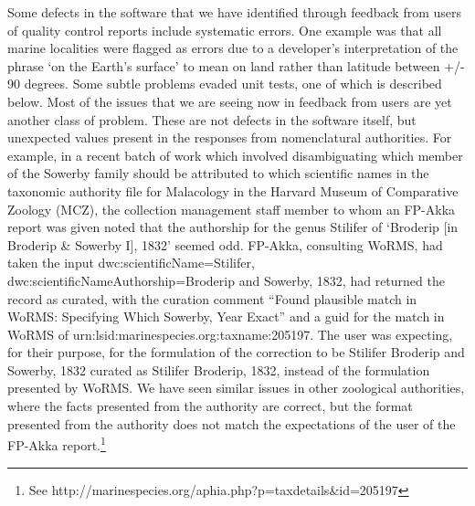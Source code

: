 \documentclass{article}
\begin{document}
Some defects in the software that we have identified through feedback from users of quality control reports include systematic errors. One example was that all marine localities were flagged as errors due to a developer's interpretation of the phrase `on the Earth's surface' to mean on land rather than latitude between +/- 90 degrees.
Some subtle problems evaded unit tests, one of which is described below.
Most of the issues that we are seeing now in feedback from users are yet another class of problem. These are not defects in the software itself, but unexpected values present in the responses from nomenclatural authorities.  For example, in a recent batch of work which involved disambiguating which member of the Sowerby family should be attributed to which scientific names in the taxonomic authority file for Malacology in the Harvard Museum of Comparative Zoology (MCZ), the collection management staff member to whom an FP-Akka report was given noted that the authorship for the genus Stilifer of `Broderip [in Broderip \& Sowerby I], 1832' seemed odd.  FP-Akka, consulting WoRMS, had taken the input dwc:scientificName=Stilifer, dwc:scientificNameAuthorship=Broderip and Sowerby, 1832, had returned the record as curated, with the curation comment ``Found plausible match in WoRMS: Specifying Which Sowerby, Year Exact'' and a guid for the match in WoRMS of urn:lsid:marinespecies.org:taxname:205197.  The user was expecting, for their purpose, for the formulation of the correction to be Stilifer Broderip and Sowerby, 1832 curated as Stilifer Broderip, 1832, instead of the formulation presented by WoRMS.  We have seen similar issues in other zoological authorities, where the facts presented from the authority are correct, but the format presented from the authority does not match the expectations of the user of the FP-Akka report.\footnote{See http://marinespecies.org/aphia.php?p=taxdetails\&id=205197}
\end{document}
